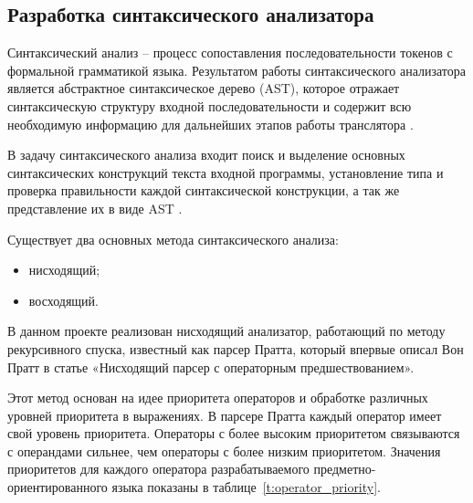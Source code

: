 \subsection{Разработка синтаксического анализатора}


Синтаксический анализ – процесс сопоставления последовательности токенов с формальной грамматикой языка.
Результатом работы синтаксического анализатора является абстрактное синтаксическое дерево (AST),
которое отражает синтаксическую структуру входной последовательности и содержит всю необходимую информацию для дальнейших этапов работы транслятора .

В задачу синтаксического анализа входит поиск и выделение основных синтаксических конструкций текста входной программы,
установление типа и проверка правильности каждой синтаксической конструкции, а так же представление их в виде AST .

Существует два основных метода синтаксического анализа:

\begin{itemize}
    \item нисходящий;
    \item восходящий.
\end{itemize}

В данном проекте реализован нисходящий анализатор, работающий по методу рекурсивного спуска,
известный как парсер Пратта, который впервые описал Вон Пратт в статье «Нисходящий парсер с операторным предшествованием».

Этот метод основан на идее приоритета операторов и обработке различных уровней приоритета в выражениях.
В парсере Пратта каждый оператор имеет свой уровень приоритета.
Операторы с более высоким приоритетом связываются с операндами сильнее, чем операторы с более низким приоритетом.
Значения приоритетов для каждого оператора разрабатываемого предметно-ориентированного языка показаны в таблице~\ref{t:operator_priority}.

\clearpage

